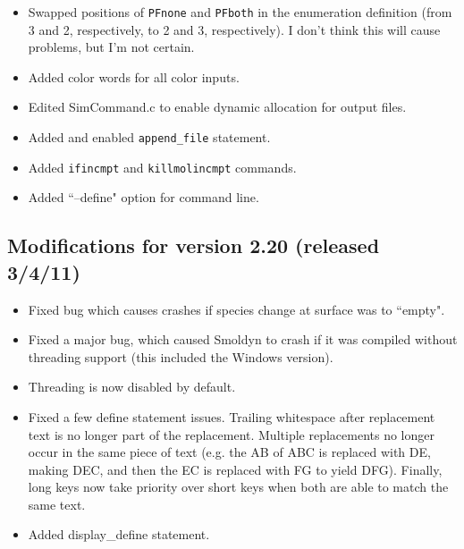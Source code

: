 \documentclass {scrbook}
\newcommand {\ttt} {\texttt}
\begin{document}
\begin{itemize}
\item Swapped positions of \ttt{PFnone} and \ttt{PFboth} in the enumeration definition (from 3 and 2, respectively, to 2 and 3, respectively). I don't think this will cause problems, but I'm not certain.
\item Added color words for all color inputs.
\item Edited SimCommand.c to enable dynamic allocation for output files.
\item Added and enabled \ttt{append\_file} statement.
\item Added \ttt{ifincmpt} and \ttt{killmolincmpt} commands.
\item Added ``--define" option for command line.
\end{itemize}

\subsection{Modifications for version 2.20 (released 3/4/11)}
\begin{itemize}
\item Fixed bug which causes crashes if species change at surface was to ``empty".
\item Fixed a major bug, which caused Smoldyn to crash if it was compiled without threading support (this included the Windows version).
\item Threading is now disabled by default.
\item Fixed a few define statement issues. Trailing whitespace after replacement text is no longer part of the replacement. Multiple replacements no longer occur in the same piece of text (e.g. the AB of ABC is replaced with DE, making DEC, and then the EC is replaced with FG to yield DFG). Finally, long keys now take priority over short keys when both are able to match the same text.
\item Added display\_define statement.
\end{itemize}
\end{document}
